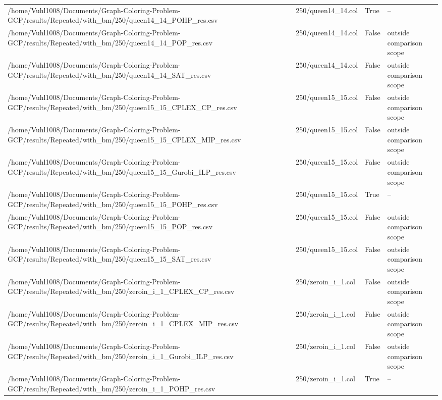 \begin{table}[htbp]
\begin{tabular}{llll}
/home/Vuhl1008/Documents/Graph-Coloring-Problem-GCP/results/Repeated/with\_bm/250/queen14\_14\_POHP\_res.csv & 250/queen14\_14.col & True & -- \\
/home/Vuhl1008/Documents/Graph-Coloring-Problem-GCP/results/Repeated/with\_bm/250/queen14\_14\_POP\_res.csv & 250/queen14\_14.col & False & outside comparison scope \\
/home/Vuhl1008/Documents/Graph-Coloring-Problem-GCP/results/Repeated/with\_bm/250/queen14\_14\_SAT\_res.csv & 250/queen14\_14.col & False & outside comparison scope \\
/home/Vuhl1008/Documents/Graph-Coloring-Problem-GCP/results/Repeated/with\_bm/250/queen15\_15\_CPLEX\_CP\_res.csv & 250/queen15\_15.col & False & outside comparison scope \\
/home/Vuhl1008/Documents/Graph-Coloring-Problem-GCP/results/Repeated/with\_bm/250/queen15\_15\_CPLEX\_MIP\_res.csv & 250/queen15\_15.col & False & outside comparison scope \\
/home/Vuhl1008/Documents/Graph-Coloring-Problem-GCP/results/Repeated/with\_bm/250/queen15\_15\_Gurobi\_ILP\_res.csv & 250/queen15\_15.col & False & outside comparison scope \\
/home/Vuhl1008/Documents/Graph-Coloring-Problem-GCP/results/Repeated/with\_bm/250/queen15\_15\_POHP\_res.csv & 250/queen15\_15.col & True & -- \\
/home/Vuhl1008/Documents/Graph-Coloring-Problem-GCP/results/Repeated/with\_bm/250/queen15\_15\_POP\_res.csv & 250/queen15\_15.col & False & outside comparison scope \\
/home/Vuhl1008/Documents/Graph-Coloring-Problem-GCP/results/Repeated/with\_bm/250/queen15\_15\_SAT\_res.csv & 250/queen15\_15.col & False & outside comparison scope \\
/home/Vuhl1008/Documents/Graph-Coloring-Problem-GCP/results/Repeated/with\_bm/250/zeroin\_i\_1\_CPLEX\_CP\_res.csv & 250/zeroin\_i\_1.col & False & outside comparison scope \\
/home/Vuhl1008/Documents/Graph-Coloring-Problem-GCP/results/Repeated/with\_bm/250/zeroin\_i\_1\_CPLEX\_MIP\_res.csv & 250/zeroin\_i\_1.col & False & outside comparison scope \\
/home/Vuhl1008/Documents/Graph-Coloring-Problem-GCP/results/Repeated/with\_bm/250/zeroin\_i\_1\_Gurobi\_ILP\_res.csv & 250/zeroin\_i\_1.col & False & outside comparison scope \\
/home/Vuhl1008/Documents/Graph-Coloring-Problem-GCP/results/Repeated/with\_bm/250/zeroin\_i\_1\_POHP\_res.csv & 250/zeroin\_i\_1.col & True & -- \\

\end{tabular}
\end{table}
